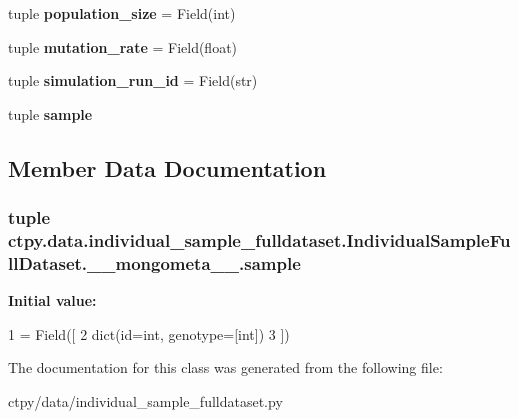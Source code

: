 \begin{DoxyCompactItemize}
\item 
\hypertarget{classctpy_1_1data_1_1individual__sample__fulldataset_1_1_individual_sample_full_dataset_1_1____mongometa_____a6ea091ab1a45931e594047d2303b0961}{tuple {\bfseries population\-\_\-size} = Field(int)}\label{classctpy_1_1data_1_1individual__sample__fulldataset_1_1_individual_sample_full_dataset_1_1____mongometa_____a6ea091ab1a45931e594047d2303b0961}

\item 
\hypertarget{classctpy_1_1data_1_1individual__sample__fulldataset_1_1_individual_sample_full_dataset_1_1____mongometa_____af1678c1ac7f3b87b0388ffa246488904}{tuple {\bfseries mutation\-\_\-rate} = Field(float)}\label{classctpy_1_1data_1_1individual__sample__fulldataset_1_1_individual_sample_full_dataset_1_1____mongometa_____af1678c1ac7f3b87b0388ffa246488904}

\item 
\hypertarget{classctpy_1_1data_1_1individual__sample__fulldataset_1_1_individual_sample_full_dataset_1_1____mongometa_____ae1a168d059742e64387a803bcdc9e176}{tuple {\bfseries simulation\-\_\-run\-\_\-id} = Field(str)}\label{classctpy_1_1data_1_1individual__sample__fulldataset_1_1_individual_sample_full_dataset_1_1____mongometa_____ae1a168d059742e64387a803bcdc9e176}

\item 
tuple {\bfseries sample}
\end{DoxyCompactItemize}


\subsection{Member Data Documentation}
\hypertarget{classctpy_1_1data_1_1individual__sample__fulldataset_1_1_individual_sample_full_dataset_1_1____mongometa_____a44bbfa0b6135e0c1c96904249b6b043f}{
\subsubsection[{sample}]{\setlength{\rightskip}{0pt plus 5cm}tuple ctpy.\-data.\-individual\-\_\-sample\-\_\-fulldataset.\-Individual\-Sample\-Full\-Dataset.\-\_\-\-\_\-mongometa\-\_\-\-\_\-.\-sample\hspace{0.3cm}{\ttfamily [static]}}}\label{classctpy_1_1data_1_1individual__sample__fulldataset_1_1_individual_sample_full_dataset_1_1____mongometa_____a44bbfa0b6135e0c1c96904249b6b043f}
{\bfseries Initial value\-:}
\begin{DoxyCode}
1 = Field([
2             dict(id=int, genotype=[int])
3         ])
\end{DoxyCode}


The documentation for this class was generated from the following file\-:\begin{DoxyCompactItemize}
\item 
ctpy/data/individual\-\_\-sample\-\_\-fulldataset.\-py\end{DoxyCompactItemize}
